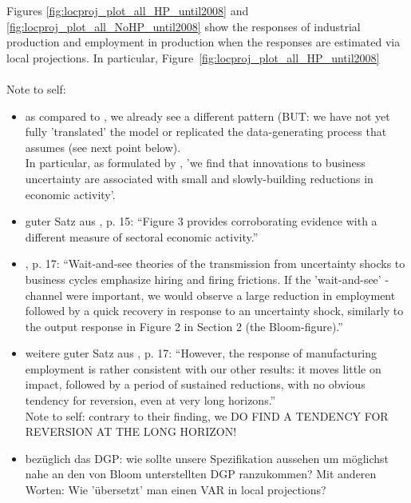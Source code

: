 \documentclass[a4paper,11pt,listof=nochaptergap,oneside,pointednumbers,bibtotoc,bigheadings,liststotoc]{scrbook}
\theoremstyle{mysatz}
\theoremstyle{mydefinition}
\theoremstyle{mybemerkung}
\begin{document}
\begin{itemize}
Figures \ref{fig:locproj_plot_all_HP_until2008} and \ref{fig:locproj_plot_all_NoHP_until2008} show the responses of industrial production and employment in production when the responses are estimated via local projections. In particular, Figure~\ref{fig:locproj_plot_all_HP_until2008} \\
\\
\begingroup
    \fontsize{8pt}{12pt}\selectfont
    Note to self:
\begin{itemize}
	\item as compared to \citet{bloom:09}, we already see a different pattern (BUT: we have not yet fully 'translated' the model or replicated the data-generating process that \citet{bloom:09} assumes (see next point below).\\
	In particular, as formulated by \citet{bachmannetal:13}, 'we find that innovations to business uncertainty are associated with small and slowly-building reductions in economic activity'. 
	\item guter Satz aus \citet{bachmannetal:13}, p. 15: ``Figure 3 provides corroborating evidence with a different measure of sectoral economic activity.'' 
	\item \citet{bachmannetal:13}, p. 17: ``Wait-and-see theories of the transmission from uncertainty shocks to business cycles emphasize hiring and firing frictions. If the 'wait-and-see' - channel were important, we would observe a large reduction in employment followed by a quick recovery in response to an uncertainty shock, similarly to the output response in Figure 2 in Section 2 (the Bloom-figure).''
	\item weitere guter Satz aus \citet{bachmannetal:13}, p. 17: ``However, the response of manufacturing employment is rather consistent with our other results: it moves little on impact, followed by a period of sustained reductions, with no obvious tendency for reversion, even at very long horizons.'' \\
	Note to self: contrary to their finding, we DO FIND A TENDENCY FOR REVERSION AT THE LONG HORIZON!
	\item bezüglich das DGP: wie sollte unsere Spezifikation aussehen um möglichst nahe an den von Bloom unterstellten DGP ranzukommen? Mit anderen Worten: Wie 'übersetzt' man einen VAR in local projections?
\end{itemize}
\endgroup


\end{itemize}
\end{document}
